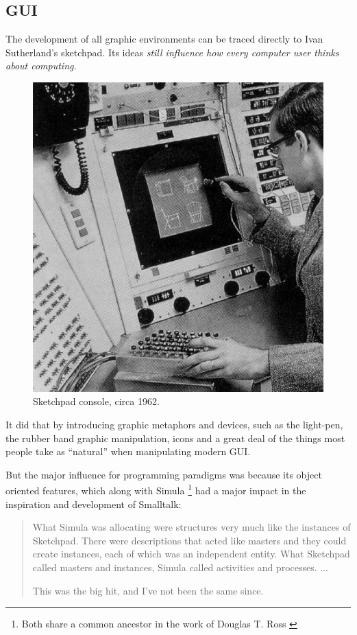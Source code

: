 \subsection{GUI}

The development of all graphic environments can be traced directly to
Ivan Sutherland's sketchpad. Its ideas \emph{still influence how every
  computer user thinks about computing.}\cite{graphics:sutherland__sketchpad}

\begin{figure}
  \begin{center}
    \includegraphics[scale=0.15]{images/sketchpad.jpeg}
  \end{center}
  \caption{Sketchpad console, circa 1962. \cite{hypertext:muller__vision_and_reality}}
\end{figure}

It did that by introducing graphic metaphors and devices, such as the
light-pen, the rubber band graphic manipulation, icons and a great
deal of the things most people take as ``natural'' when manipulating
modern GUI. \cite{graphics:sutherland__sketchpad}

But the major influence for programming paradigms was because its
object oriented features, which along with Simula \footnote{Both share
  a common ancestor in the work of Douglas T. Ross
  \cite{graphics:sutherland__sketchpad}} had a major impact in the
inspiration and development of Smalltalk: 

\begin{quote}
  What Simula was allocating were structures very much like the
  instances of Sketchpad. There were descriptions that acted like
  masters and they could create instances, each of which was an
  independent entity. What Sketchpad called masters and instances,
  Simula called activities and processes. ...

  This was the big hit, and I've not been the same since.
  \cite{smalltalk:kay_alan__early_history_smalltalk}
\end{quote} 
